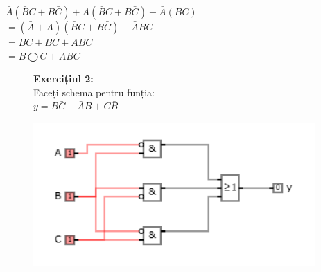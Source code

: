 \documentclass[12pt]{article}
\begin{document}
$\bar{A}(\bar{B}C+B\bar{C})+A(\bar{B}C+B\bar{C})+\bar{A}(BC)$\\
$=(\bar{A}+A)(\bar{B}C+B\bar{C})+\bar{A}BC$\\
$=\bar{B}C+B\bar{C}+\bar{A}BC$\\
$=B\bigoplus C +\bar{A}BC$\\

\begin{figure}[H]
    \begin{minipage}{0.4\textwidth}
        \textbf{Exercițiul 2:\\}
        Faceți schema pentru funția:\\
        $y=B\bar{C}+\bar{A}B+C\bar{B}$\\
    \end{minipage}
    \hfill
    \begin{minipage}{0.5\textwidth}
        \includegraphics[scale=0.8]{schema1.png}
    \end{minipage}
\end{figure}
\end{document}
